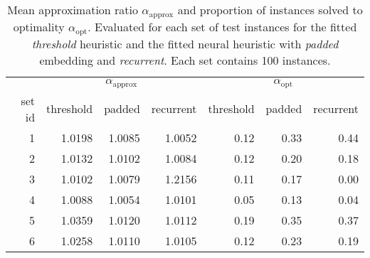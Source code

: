 

\begin{knitrout}
\color{fgcolor}\begin{table}[H]
\centering
\caption{\label{tab:unnamed-chunk-2}Mean approximation ratio $\alpha_\text{approx}$ and proportion of instances solved to optimality $\alpha_\text{opt}$. Evaluated for each set of test instances for the fitted \textit{threshold} heuristic and the fitted neural heuristic with \textit{padded} embedding and \textit{recurrent}. Each set contains 100 instances. \label{tab:objectives}}
\centering
\begin{tabular}[t]{rrrrrrr}
\toprule
\multicolumn{1}{c}{ } & \multicolumn{3}{c}{$\alpha_\text{approx}$} & \multicolumn{3}{c}{$\alpha_\text{opt}$} \\
\cmidrule(l{3pt}r{3pt}){2-4} \cmidrule(l{3pt}r{3pt}){5-7}
set id & threshold & padded & recurrent & threshold & padded & recurrent\\
\midrule
1 & 1.0198 & 1.0085 & 1.0052 & 0.12 & 0.33 & 0.44\\
2 & 1.0132 & 1.0102 & 1.0084 & 0.12 & 0.20 & 0.18\\
3 & 1.0102 & 1.0079 & 1.2156 & 0.11 & 0.17 & 0.00\\
4 & 1.0088 & 1.0054 & 1.0101 & 0.05 & 0.13 & 0.04\\
5 & 1.0359 & 1.0120 & 1.0112 & 0.19 & 0.35 & 0.37\\
6 & 1.0258 & 1.0110 & 1.0105 & 0.12 & 0.23 & 0.19\\
\bottomrule
\end{tabular}
\end{table}

\end{knitrout}
